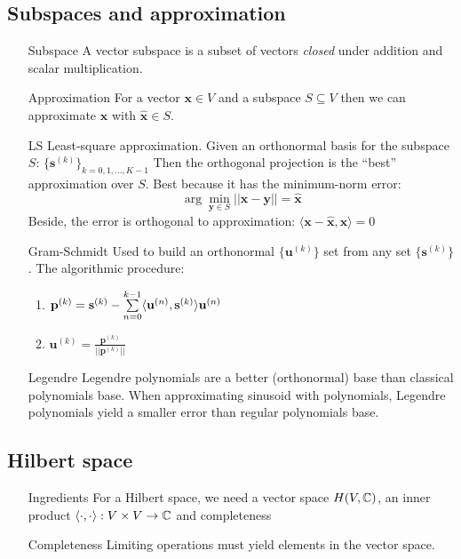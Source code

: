 \documentclass[11pt,a4paper]{article}
\begin{document}
\subsection{Subspaces and approximation}
\begin{itemize}
	\item[Subspace] A vector subspace is a subset of vectors \textit{closed} under addition and scalar multiplication.
	\item[Approximation]For a vector $\mathbf{x} \in V$ and a subspace $S \subseteq V$ then we can approximate $\mathbf{x}$ with $\hat{\mathbf{x}} \in S$.
	\item[LS]Least-square approximation. Given an orthonormal basis for the subspace $S$: ${\{\mathbf{s}^{(k)}\}}_{k=0,1,\ldots,K-1}$ Then the orthogonal projection is the ``best'' approximation over $S$. Best because it has the minimum-norm error: \[\arg\min\limits_{\mathbf{y} \in S} ||\mathbf{x}- \mathbf{y}|| = \hat{\mathbf{x}}\]Beside, the error is orthogonal to approximation: $\langle\mathbf{x}-\hat{\mathbf{x}},\mathbf{x}\rangle = 0$

	\item[Gram-Schmidt]Used to build an orthonormal $\{\mathbf{u}^{(k)}\}$ set from any set $\{\mathbf{s}^{(k)}\}$. The algorithmic procedure:
	      \begin{enumerate}
		      \item $\mathbf{p}^{(k)} = \mathbf{s}^{(k)} - \somme{k-1}{n=0}\langle\mathbf{u}^{(n)},\mathbf{s}^{(k)}\rangle\mathbf{u}^{(n)}$
		      \item $\mathbf{u}^{(k)} = \frac{\mathbf{p}^{(k)}}{||\mathbf{p}^{(k)}||}$
	      \end{enumerate}
	\item[Legendre]Legendre polynomials are a better (orthonormal) base than classical polynomials base. When approximating sinusoid with polynomials, Legendre polynomials yield a smaller error than regular polynomials base.
\end{itemize}

\subsection{Hilbert space}
\begin{itemize}
	\item[Ingredients]For a Hilbert space, we need a vector space $H(V,\C)$, an inner product $\langle\cdot,\cdot\rangle : V \times V \to \C$ and completeness
	\item[Completeness]Limiting operations must yield elements in the vector space.
\end{itemize}
\end{document}
